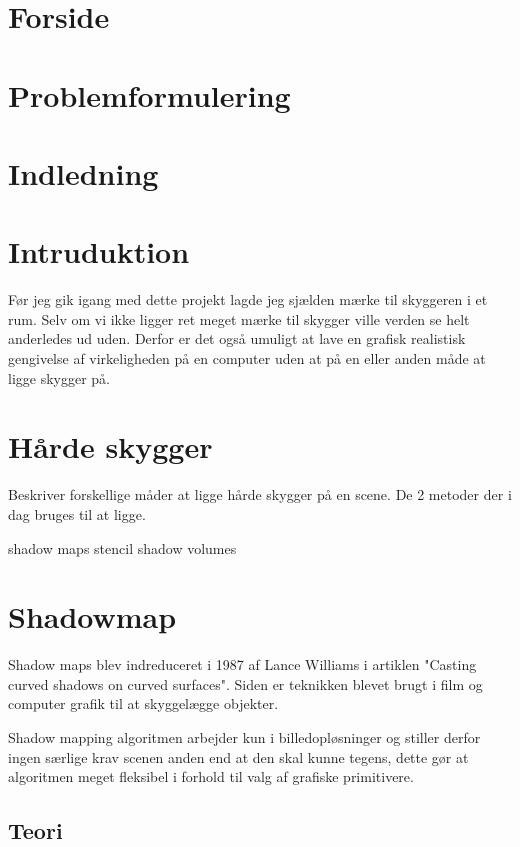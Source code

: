 \documentclass[11pt,a4paper]{article}
\begin{document}
\section{Forside}

\section{Problemformulering}



\section{Indledning}


\section{Intruduktion}
Før jeg gik igang med dette projekt lagde jeg sjælden mærke til skyggeren i et rum. Selv om vi ikke ligger ret meget mærke til skygger ville verden se helt anderledes ud uden. Derfor er det også umuligt at lave en grafisk realistisk gengivelse af virkeligheden på en computer uden at på en eller anden måde at ligge skygger på.

\section{Hårde skygger}
Beskriver forskellige måder at ligge hårde skygger på en scene. De 2 metoder der i dag bruges til at ligge.

shadow maps
stencil shadow volumes

\section{Shadowmap}

Shadow maps blev indreduceret i 1987 af Lance Williams i artiklen "Casting curved shadows on curved surfaces". Siden er teknikken blevet brugt i film og computer grafik til at skyggelægge objekter.

Shadow mapping algoritmen arbejder kun i billedopløsninger og stiller derfor ingen særlige krav scenen anden end at den skal kunne tegens, dette gør at algoritmen meget fleksibel i forhold til valg af grafiske primitivere.


\subsection{Teori}
\end{document}
